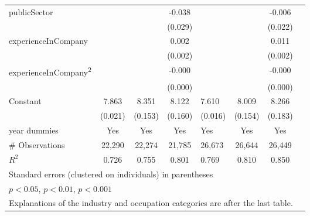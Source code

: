 \begin{longtable}{l*{3}{c}|l*{3}{c}}
		publicSector      &                     &                     &      -0.038         &                     &                     &      -0.006         \\
		&                     &                     &     (0.029)         &                     &                     &     (0.022)         \\
		experienceInCompany &                     &                     &       0.002         &                     &                     &       0.011\sym{***}\\
		&                     &                     &     (0.002)         &                     &                     &     (0.002)         \\
		experienceInCompany\textsuperscript{2}&                     &                     &      -0.000         &                     &                     &      -0.000\sym{***}\\
		&                     &                     &     (0.000)         &                     &                     &     (0.000)         \\
		Constant            &       7.863\sym{***}&       8.351\sym{***}&       8.122\sym{***}&       7.610\sym{***}&       8.009\sym{***}&       8.266\sym{***}\\
		&     (0.021)         &     (0.153)         &     (0.160)         &     (0.016)         &     (0.154)         &     (0.183)         \\
		year dummies        &         Yes         &         Yes         &         Yes         &         Yes         &         Yes         &         Yes         \\
		\midrule
	\#	Observations        &       22,290         &       22,274         &       21,785         &       26,673         &       26,644         &       26,449         \\
		 \(R^{2}\)  &       0.726         &       0.755         &       0.801         &       0.769         &       0.810         &       0.850         \\
		\bottomrule
		\multicolumn{7}{l}{\footnotesize Standard errors (clustered on individuals) in parentheses}\\
		\multicolumn{7}{l}{\footnotesize \sym{*} \(p<0.05\), \sym{**} \(p<0.01\), \sym{***} \(p<0.001\)} \\
		\multicolumn{7}{l}{Explanations of the industry and occupation categories are after the last table.}
          \label{tab:et_wage_full}
	\end{longtable}


